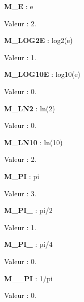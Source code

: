 \begin{DoxyItemize}
\item {\bfseries M\+\_\+E} \+: e
\begin{DoxyItemize}
\item Valeur \+: 2.
\end{DoxyItemize}
\item {\bfseries M\+\_\+\+L\+O\+G2E} \+: log2(e)
\begin{DoxyItemize}
\item Valeur \+: 1.
\end{DoxyItemize}
\item {\bfseries M\+\_\+\+L\+O\+G10E} \+: log10(e)
\begin{DoxyItemize}
\item Valeur \+: 0.
\end{DoxyItemize}
\item {\bfseries M\+\_\+\+L\+N2} \+: ln(2)
\begin{DoxyItemize}
\item Valeur \+: 0.
\end{DoxyItemize}
\item {\bfseries M\+\_\+\+L\+N10} \+: ln(10)
\begin{DoxyItemize}
\item Valeur \+: 2.
\end{DoxyItemize}
\item {\bfseries M\+\_\+\+PI} \+: pi
\begin{DoxyItemize}
\item Valeur \+: 3.
\end{DoxyItemize}
\item {\bfseries M\+\_\+\+P\+I\+\_} \+: pi/2
\begin{DoxyItemize}
\item Valeur \+: 1.
\end{DoxyItemize}
\item {\bfseries M\+\_\+\+P\+I\+\_} \+: pi/4
\begin{DoxyItemize}
\item Valeur \+: 0.
\end{DoxyItemize}
\item {\bfseries M\+\_\+\_\+\+PI} \+: 1/pi
\begin{DoxyItemize}
\item Valeur \+: 0.
\end{DoxyItemize}

\end{DoxyItemize}
